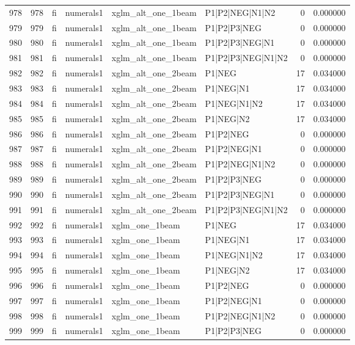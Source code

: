 \begin{tabular}{lrllllrr}
978 & 978 & fi & numerals1 & xglm_alt_one_1beam & P1|P2|NEG|N1|N2 & 0 & 0.000000 \\
979 & 979 & fi & numerals1 & xglm_alt_one_1beam & P1|P2|P3|NEG & 0 & 0.000000 \\
980 & 980 & fi & numerals1 & xglm_alt_one_1beam & P1|P2|P3|NEG|N1 & 0 & 0.000000 \\
981 & 981 & fi & numerals1 & xglm_alt_one_1beam & P1|P2|P3|NEG|N1|N2 & 0 & 0.000000 \\
982 & 982 & fi & numerals1 & xglm_alt_one_2beam & P1|NEG & 17 & 0.034000 \\
983 & 983 & fi & numerals1 & xglm_alt_one_2beam & P1|NEG|N1 & 17 & 0.034000 \\
984 & 984 & fi & numerals1 & xglm_alt_one_2beam & P1|NEG|N1|N2 & 17 & 0.034000 \\
985 & 985 & fi & numerals1 & xglm_alt_one_2beam & P1|NEG|N2 & 17 & 0.034000 \\
986 & 986 & fi & numerals1 & xglm_alt_one_2beam & P1|P2|NEG & 0 & 0.000000 \\
987 & 987 & fi & numerals1 & xglm_alt_one_2beam & P1|P2|NEG|N1 & 0 & 0.000000 \\
988 & 988 & fi & numerals1 & xglm_alt_one_2beam & P1|P2|NEG|N1|N2 & 0 & 0.000000 \\
989 & 989 & fi & numerals1 & xglm_alt_one_2beam & P1|P2|P3|NEG & 0 & 0.000000 \\
990 & 990 & fi & numerals1 & xglm_alt_one_2beam & P1|P2|P3|NEG|N1 & 0 & 0.000000 \\
991 & 991 & fi & numerals1 & xglm_alt_one_2beam & P1|P2|P3|NEG|N1|N2 & 0 & 0.000000 \\
992 & 992 & fi & numerals1 & xglm_one_1beam & P1|NEG & 17 & 0.034000 \\
993 & 993 & fi & numerals1 & xglm_one_1beam & P1|NEG|N1 & 17 & 0.034000 \\
994 & 994 & fi & numerals1 & xglm_one_1beam & P1|NEG|N1|N2 & 17 & 0.034000 \\
995 & 995 & fi & numerals1 & xglm_one_1beam & P1|NEG|N2 & 17 & 0.034000 \\
996 & 996 & fi & numerals1 & xglm_one_1beam & P1|P2|NEG & 0 & 0.000000 \\
997 & 997 & fi & numerals1 & xglm_one_1beam & P1|P2|NEG|N1 & 0 & 0.000000 \\
998 & 998 & fi & numerals1 & xglm_one_1beam & P1|P2|NEG|N1|N2 & 0 & 0.000000 \\
999 & 999 & fi & numerals1 & xglm_one_1beam & P1|P2|P3|NEG & 0 & 0.000000 \\

\end{tabular}
